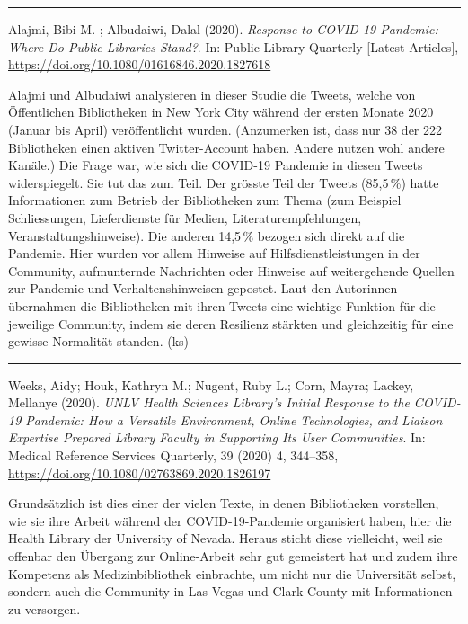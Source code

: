 \documentclass[a4paper,
fontsize=11pt,
oneside,
numbers=noperiodatend,
parskip=half-,
bibliography=totoc,
final
]{scrartcl}
\begin{document}
\begin{center}\rule{0.5\linewidth}{0.5pt}\end{center}

Alajmi, Bibi M. ; Albudaiwi, Dalal (2020). \emph{Response to COVID-19
Pandemic: Where Do Public Libraries Stand?}. In: Public Library
Quarterly {[}Latest Articles{]},
\url{https://doi.org/10.1080/01616846.2020.1827618}

Alajmi und Albudaiwi analysieren in dieser Studie die Tweets, welche von
Öffentlichen Bibliotheken in New York City während der ersten Monate
2020 (Januar bis April) veröffentlicht wurden. (Anzumerken ist, dass nur
38 der 222 Bibliotheken einen aktiven Twitter-Account haben. Andere
nutzen wohl andere Kanäle.) Die Frage war, wie sich die COVID-19
Pandemie in diesen Tweets widerspiegelt. Sie tut das zum Teil. Der
grösste Teil der Tweets (85,5\,\%) hatte Informationen zum Betrieb der
Bibliotheken zum Thema (zum Beispiel Schliessungen, Lieferdienste für
Medien, Literaturempfehlungen, Veranstaltungshinweise). Die anderen
14,5\,\% bezogen sich direkt auf die Pandemie. Hier wurden vor allem
Hinweise auf Hilfsdienstleistungen in der Community, aufmunternde
Nachrichten oder Hinweise auf weitergehende Quellen zur Pandemie und
Verhaltenshinweisen gepostet. Laut den Autorinnen übernahmen die
Bibliotheken mit ihren Tweets eine wichtige Funktion für die jeweilige
Community, indem sie deren Resilienz stärkten und gleichzeitig für eine
gewisse Normalität standen. (ks)

\begin{center}\rule{0.5\linewidth}{0.5pt}\end{center}

Weeks, Aidy; Houk, Kathryn M.; Nugent, Ruby L.; Corn, Mayra; Lackey,
Mellanye (2020). \emph{UNLV Health Sciences Library's Initial Response
to the COVID-19 Pandemic: How a Versatile Environment, Online
Technologies, and Liaison Expertise Prepared Library Faculty in
Supporting Its User Communities}. In: Medical Reference Services
Quarterly, 39 (2020) 4, 344--358,
\url{https://doi.org/10.1080/02763869.2020.1826197}

Grundsätzlich ist dies einer der vielen Texte, in denen Bibliotheken
vorstellen, wie sie ihre Arbeit während der COVID-19-Pandemie
organisiert haben, hier die Health Library der University of Nevada.
Heraus sticht diese vielleicht, weil sie offenbar den Übergang zur
Online-Arbeit sehr gut gemeistert hat und zudem ihre Kompetenz als
Medizinbibliothek einbrachte, um nicht nur die Universität selbst,
sondern auch die Community in Las Vegas und Clark County mit
Informationen zu versorgen.
\end{document}
